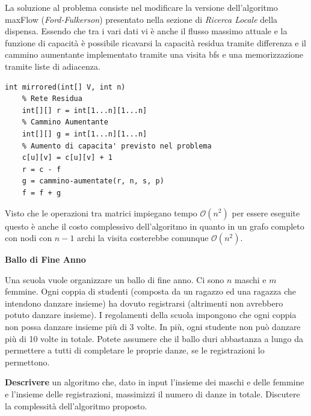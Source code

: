 \documentclass[../cheatSheetAlgoritmi.tex]{subfiles}
\begin{document}
La soluzione al problema consiste nel modificare la versione dell'algoritmo maxFlow \hfill \break (\emph{Ford-Fulkerson}) presentato nella sezione di \emph{Ricerca Locale} della dispensa. Essendo che tra i vari dati vi è anche il flusso massimo attuale e la funzione di capacità è possibile ricavarsi la capacità residua tramite differenza e il cammino aumentante implementato tramite una visita bfs e una memorizzazione tramite liste di adiacenza.
\newpage
\begin{lstlisting}[caption=Aggiornamento Flusso Massimo]
int mirrored(int[] V, int n)
	% Rete Residua
	int[][] r = int[1...n][1...n]
	% Cammino Aumentante
	int[][] g = int[1...n][1...n]
	% Aumento di capacita' previsto nel problema 
	c[u][v] = c[u][v] + 1
	r = c - f
	g = cammino-aumentate(r, n, s, p)
	f = f + g
\end{lstlisting}
Visto che le operazioni tra matrici impiegano tempo $\mathcal{O}(n^{2})$ per essere eseguite questo è anche il costo complessivo dell'algoritmo in quanto in un grafo completo con nodi con $n-1$ archi la visita costerebbe comunque $\mathcal{O}(n^{2})$.

\bigskip

\textbf{Ballo di Fine Anno}

Una scuola vuole organizzare un ballo di fine anno. Ci sono $n$ maschi e $m$ femmine. Ogni coppia di studenti (composta da un ragazzo ed una ragazza che intendono danzare insieme) ha dovuto registrarsi (altrimenti non avrebbero potuto danzare insieme). I regolamenti della scuola impongono che ogni coppia non possa danzare insieme più di 3 volte. In più, ogni studente non può danzare più di 10 volte in totale. Potete assumere che il ballo duri abbastanza a lungo da permettere a tutti di completare le proprie danze, se le registrazioni lo permettono.

\textbf{Descrivere} un algoritmo che, dato in input l’insieme dei maschi e delle femmine e l’insieme delle registrazioni, massimizzi il numero di danze in totale. Discutere la complessità dell’algoritmo proposto.
\end{document}
